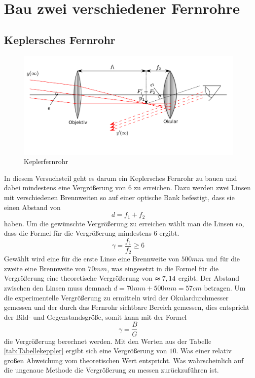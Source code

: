 \section{Bau zwei verschiedener Fernrohre}
\subsection{Keplersches Fernrohr}

\begin{figure}[h!]
    \centering
    \includegraphics[scale=0.8]{Geometrische_Optik/Protokoll/fig/Keplerfernrohr.png}
    \caption{Keplerfernrohr}
    \label{fig:Keplerfernrohr}
\end{figure}

In diesem Versuchsteil geht es darum ein Keplersches Fernrohr zu bauen und dabei mindestens eine Vergrößerung von 6 zu erreichen. Dazu werden zwei Linsen mit verschiedenen Brennweiten so auf einer optische Bank befestigt, dass sie einen Abstand von $$ d = f_1 + f_2 $$ haben. Um die gewünschte Vergrößerung zu erreichen wählt man die Linsen so, dass die Formel für die Vergrößerung mindestens 6 ergibt. $$  \gamma = \frac{f_1}{f_2} \geqslant 6$$Gewählt wird eine für die erste Linse eine Brennweite von $500mm$ und für die zweite eine Brennweite von $70mm$, was eingesetzt in die Formel für die Vergrößerung eine theoretische Vergrößerung von $\thickapprox 7,14 $ ergibt. Der Abstand zwischen den Linsen muss demnach $d = 70mm + 500mm = 57cm$ betragen.
Um die experimentelle Vergrößerung zu ermitteln wird der Okulardurchmesser gemessen und der durch das Fernrohr sichtbare Bereich gemessen, dies entspricht der Bild- und Gegenstandsgröße, somit kann mit der Formel $$ \gamma = \frac{B}{G} $$ die Vergrößerung berechnet werden. Mit den Werten aus der Tabelle \ref{tab:Tabellekeppler} ergibt sich eine Vergrößerung von $10$. Was einer relativ großen Abweichung vom theoretischen Wert entspricht. Was wahrscheinlich auf die ungenaue Methode die Vergrößerung zu messen zurückzuführen ist.

